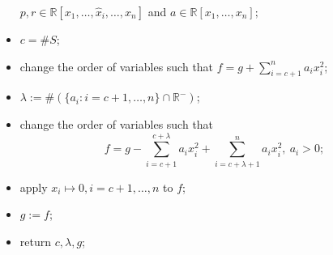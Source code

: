 \documentclass[noend]{amsproc}
\begin{document}
\begin{itemize}
$p,r\in\mathbb R[x_1,\ldots,\hat x_i,\ldots,x_n]$\newline
\phantom{}\quad\quad\quad\quad\quad and $a\in\mathbb
R[x_1,\ldots,x_n];$\newline
\item $c =\# S$;
\item change the order of variables such that $\displaystyle
f=g+\sum_{i=c+1}^na_ix_i^2$;
\item $\lambda:=\#(\{a_i:i=c+1,\ldots,n\}\cap\mathbb R^-)$;
\item change the order of variables such that
\[f=g-\sum_{i=c+1}^{c+\lambda}a_ix_i^2+\sum_{i=c+\lambda+1}^na_ix_i^2,\
a_i>0;\]
\item apply $x_i\mapsto 0, i=c+1,\ldots,n$ to $f$;
\item $g:=f$;
\item return $c, \lambda, g$;
\end{itemize}
\end{document}
